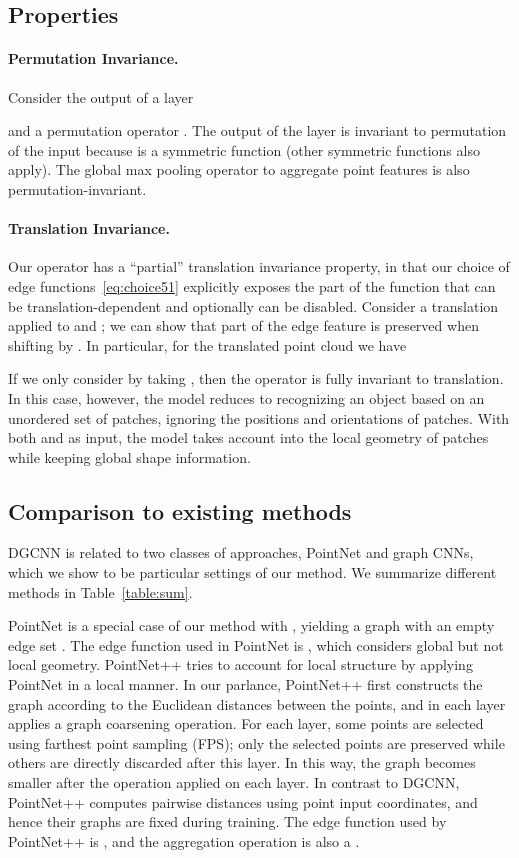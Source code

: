 \documentclass[acmtog]{acmart}
\begin{document}
\subsection{Properties}

\paragraph*{Permutation Invariance.}
Consider the output of a layer 

and a permutation operator . The output of the layer  is invariant to permutation of the input  because  is a symmetric function (other symmetric functions also apply). The global max pooling operator to aggregate point features is also permutation-invariant.


\paragraph*{Translation Invariance.}
Our operator has a ``partial'' translation invariance property, in that our choice of edge functions~\eqref{eq:choice51} explicitly exposes the part of the function that can be translation-dependent and optionally can be disabled. Consider a translation  applied to  and ; we can show that part of the edge feature is preserved when shifting by . In particular, for the translated point cloud we have 


If we only consider  by taking , then the operator is fully invariant to translation. In this case, however, the model reduces to recognizing an object based on an unordered set of patches, ignoring the positions and orientations of patches. With both  and  as input, the model takes account into the local geometry of patches while keeping global shape information. 

\subsection{Comparison to existing methods} 

DGCNN is related to two classes of approaches, PointNet and graph CNNs, which we show to be particular settings of our method. We summarize different methods in Table~\ref{table:sum}.

PointNet is a special case of our method with , yielding a graph with an empty edge set . The edge function used in PointNet is , which considers global but not local geometry. 
PointNet++ tries to account for local structure by applying PointNet in a local manner. In our parlance, PointNet++ first constructs the graph according to the Euclidean distances between the points, and in each layer applies a graph coarsening operation. For each layer, some points are selected using farthest point sampling (FPS); only the selected points are preserved while others are directly discarded after this layer. In this way, the graph becomes smaller after the operation applied on each layer. In contrast to DGCNN, PointNet++ computes pairwise distances using point input coordinates, and hence their graphs are fixed during training.  The edge function used by PointNet++ is , and the aggregation operation is also a . 
\end{document}
